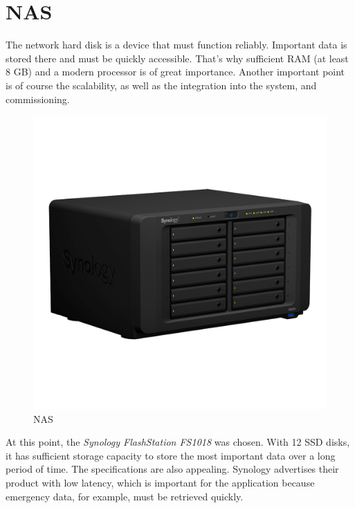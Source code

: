 \section{NAS }
The network hard disk is a device that must function reliably. Important data is stored there and must be quickly accessible. That's why sufficient RAM (at least 8 GB) and a modern processor is of great importance. Another important point is of course the scalability, as well as the integration into the system, and commissioning.
\clearpage
\begin{figure}[h]
	\centering
	\includegraphics[width=.6\textwidth]{images/CostAnalysis/synologyFS1018} 
	\caption{NAS}
	\label{fig:nas}
\end{figure}

At this point, the \textit{Synology FlashStation FS1018} was chosen. With 12 SSD disks, it has sufficient storage capacity to store the most important data over a long period of time. The specifications are also appealing. Synology advertises their product with low latency, which is important for the application because emergency data, for example, must be retrieved quickly.

